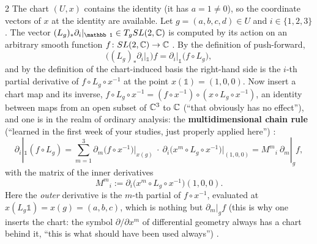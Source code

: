 \begin{paracol}{2}
The chart $(U,x)$ contains the identity (it has $a=1\ne0$), so the coordinate vectors of $x$ at the identity are available. Let $g=(a,b,c,d)\in U$ and $i\in\{1,2,3\}$. The vector $(L_g)_*\partial_i|_{\mathbb 1}\in T_gSL(2,\C)$ is computed by its action on an arbitrary smooth function $f\colon SL(2,\mathbb{C})\to\mathbb{C}$        . By the definition of push-forward,
\[
  \bigl((L_g)_*\partial_i|_{\mathbb 1}\bigr)f=\partial_i|_{\mathbb 1}\bigl(f\circ L_g\bigr),
\]
and by the definition of the chart-induced basis the right-hand side is the $i$-th partial derivative of $f\circ L_g\circ x^{-1}$ at the point $x(\mathbb 1)=(1,0,0)$. Now insert a chart map and its inverse, $f\circ L_g\circ x^{-1}=(f\circ x^{-1})\circ(x\circ L_g\circ x^{-1})$, an identity between maps from an open subset of $\mathbb{C}^3$ to $\mathbb{C}$ (``that obviously has no effect''), and one is in the realm of ordinary analysis: the \textbf{multidimensional chain rule} (``learned in the first week of your studies, just properly applied here'')               :
\[
  \partial_i|_{\mathbb 1}(f\circ L_g)=\sum_{m=1}^{3}\partial_m\bigl(f\circ x^{-1}\bigr)\Big|_{x(g)}\ \cdot\ \partial_i\bigl(x^m\circ L_g\circ x^{-1}\bigr)\Big|_{(1,0,0)}
  =M^m{}_i\ \partial_m|_g f,
\]
with the matrix of the inner derivatives
\[
  M^m{}_i:=\partial_i\bigl(x^m\circ L_g\circ x^{-1}\bigr)(1,0,0).
\]
Here the \emph{outer} derivative is the $m$-th partial of $f\circ x^{-1}$, evaluated at $x(L_g\mathbb 1)=x(g)=(a,b,c)$, which is nothing but $\partial_m|_gf$ (this is why one inserts the chart: the symbol $\partial/\partial x^m$ of differential geometry always has a chart behind it, ``this is what should have been used always'')                 .


\end{paracol}
